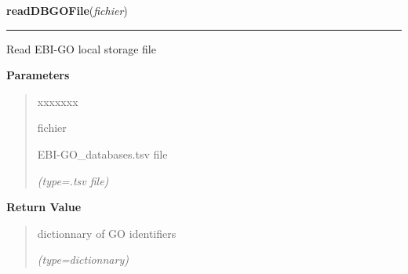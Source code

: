    \label{VCFtoGO:readDBGOFile}

    \vspace{0.5ex}

\hspace{.8\funcindent}\begin{boxedminipage}{\funcwidth}

    \raggedright \textbf{readDBGOFile}(\textit{fichier})

    \vspace{-1.5ex}

    \rule{\textwidth}{0.5\fboxrule}
\setlength{\parskip}{2ex}
    Read EBI-GO local storage file

\setlength{\parskip}{1ex}
      \textbf{Parameters}
      \vspace{-1ex}

      \begin{quote}
        \begin{Ventry}{xxxxxxx}

          \item[fichier]

          EBI-GO\_databases.tsv file

            {\it (type=.tsv file)}

        \end{Ventry}

      \end{quote}

      \textbf{Return Value}
    \vspace{-1ex}

      \begin{quote}
      dictionnary of GO identifiers

      {\it (type=dictionnary)}

      \end{quote}

    \end{boxedminipage}

    \label{VCFtoGO:extractinfopos}

    \vspace{0.5ex}

